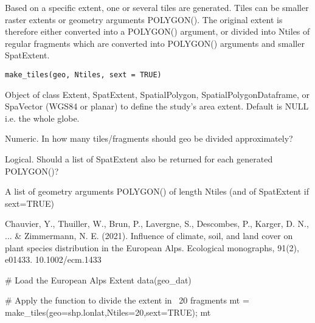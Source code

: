 \documentclass[a4paper]{book}
\begin{document}
%
\begin{Description}\relax
Based on a specific extent, one or several tiles are generated. Tiles can be smaller
raster extents or geometry arguments POLYGON(). The original extent is therefore either
converted into a POLYGON() argument, or divided into Ntiles of regular fragments which are
converted into POLYGON() arguments and smaller SpatExtent.
\end{Description}
%
\begin{Usage}
\begin{verbatim}
make_tiles(geo, Ntiles, sext = TRUE)
\end{verbatim}
\end{Usage}
%
\begin{Arguments}
\begin{ldescription}
\item[\code{geo}] Object of class Extent, SpatExtent, SpatialPolygon, SpatialPolygonDataframe,
or SpaVector (WGS84 or planar) to define the study's area extent. Default is NULL i.e. the
whole globe.

\item[\code{Ntiles}] Numeric. In how many tiles/fragments should geo be divided approximately?

\item[\code{sext}] Logical. Should a list of SpatExtent also be returned for each generated POLYGON()?
\end{ldescription}
\end{Arguments}
%
\begin{Value}
A list of geometry arguments POLYGON() of length Ntiles (and of SpatExtent
if sext=TRUE)
\end{Value}
%
\begin{References}\relax
Chauvier, Y., Thuiller, W., Brun, P., Lavergne, S., Descombes, P., Karger, D. N., ... \& Zimmermann,
N. E. (2021). Influence of climate, soil, and land cover on plant species distribution in the
European Alps. Ecological monographs, 91(2), e01433. 10.1002/ecm.1433
\end{References}
%
\begin{Examples}
\begin{ExampleCode}

# Load the European Alps Extent
data(geo_dat)

# Apply the function to divide the extent in ~20 fragments
mt = make_tiles(geo=shp.lonlat,Ntiles=20,sext=TRUE); mt
\end{ExampleCode}
\end{Examples}
\end{document}
